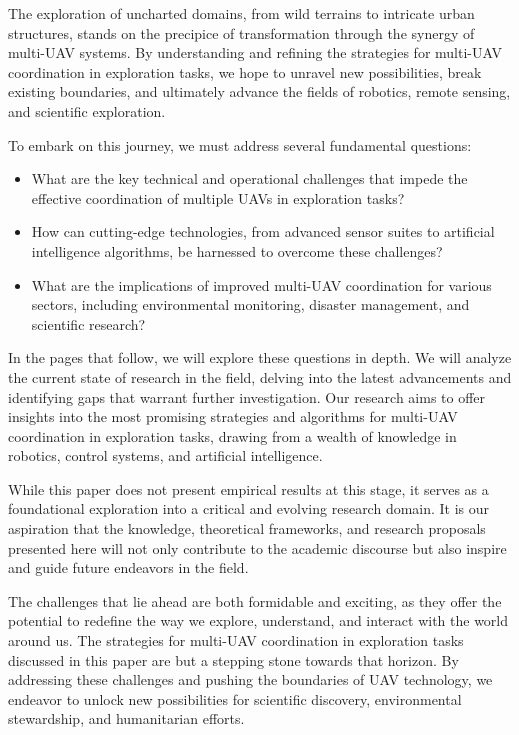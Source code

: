 \documentclass[sigconf]{acmart}
\begin{document}
The exploration of uncharted domains, from wild terrains to intricate urban structures, stands on the precipice of transformation through the synergy of multi-UAV systems. By understanding and refining the strategies for multi-UAV coordination in exploration tasks, we hope to unravel new possibilities, break existing boundaries, and ultimately advance the fields of robotics, remote sensing, and scientific exploration.

To embark on this journey, we must address several fundamental questions:
\begin{itemize}
  \item What are the key technical and operational challenges that impede the effective coordination of multiple UAVs in exploration tasks?
  \item How can cutting-edge technologies, from advanced sensor suites to artificial intelligence algorithms, be harnessed to overcome these challenges?
  \item What are the implications of improved multi-UAV coordination for various sectors, including environmental monitoring, disaster management, and scientific research?
\end{itemize}

In the pages that follow, we will explore these questions in depth. We will analyze the current state of research in the field, delving into the latest advancements and identifying gaps that warrant further investigation. Our research aims to offer insights into the most promising strategies and algorithms for multi-UAV coordination in exploration tasks, drawing from a wealth of knowledge in robotics, control systems, and artificial intelligence.

While this paper does not present empirical results at this stage, it serves as a foundational exploration into a critical and evolving research domain. It is our aspiration that the knowledge, theoretical frameworks, and research proposals presented here will not only contribute to the academic discourse but also inspire and guide future endeavors in the field.

The challenges that lie ahead are both formidable and exciting, as they offer the potential to redefine the way we explore, understand, and interact with the world around us. The strategies for multi-UAV coordination in exploration tasks discussed in this paper are but a stepping stone towards that horizon. By addressing these challenges and pushing the boundaries of UAV technology, we endeavor to unlock new possibilities for scientific discovery, environmental stewardship, and humanitarian efforts.
\end{document}
